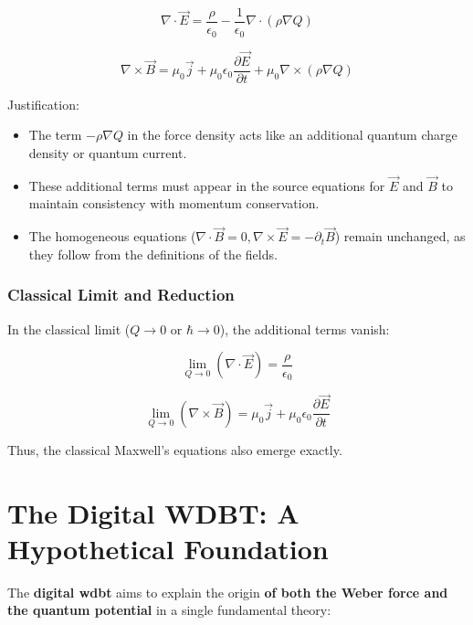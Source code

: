 \begin{equation}
    \nabla \cdot \vec{E} = \frac{\rho}{\epsilon_0} - \frac{1}{\epsilon_0} \nabla \cdot (\rho \nabla Q)
\end{equation}

\begin{equation}
    \nabla \times \vec{B} = \mu_0 \vec{j} + \mu_0 \epsilon_0 \frac{\partial \vec{E}}{\partial t} + \mu_0 \nabla \times (\rho \nabla Q)
\end{equation}

Justification:

\begin{itemize}
    \item The term $-\rho \nabla Q$ in the force density acts like an additional quantum charge density or quantum current.
    \item These additional terms must appear in the source equations for $\vec{E}$ and $\vec{B}$ to maintain consistency with momentum conservation.
    \item The homogeneous equations ($\nabla \cdot \vec{B} = 0, \nabla \times \vec{E} = -\partial_t \vec{B}$) remain unchanged, as they follow from the definitions of the fields.
\end{itemize}

\subsubsection{Classical Limit and Reduction}
In the classical limit ($Q \to 0$ or $\hbar \to 0$), the additional terms vanish:

\begin{equation}
    \lim_{Q \to 0} \left( \nabla \cdot \vec{E} \right) = \frac{\rho}{\epsilon_0}
\end{equation}

\begin{equation}
    \lim_{Q \to 0} \left( \nabla \times \vec{B} \right) = \mu_0 \vec{j} + \mu_0 \epsilon_0 \frac{\partial \vec{E}}{\partial t}
\end{equation}

Thus, the classical Maxwell's equations also emerge exactly.

\section{The Digital WDBT: A Hypothetical Foundation}
The \textbf{digital \gls{wdbt}} aims to explain the origin \textbf{of both the Weber force and the quantum potential} in a single fundamental theory:

